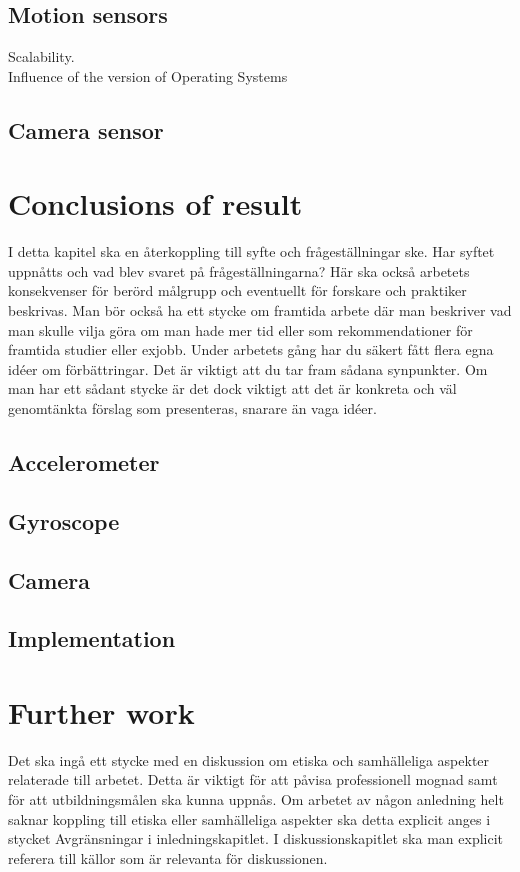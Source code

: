 \subsection{Motion sensors}
Scalability.\\
Influence of the version of Operating Systems \\

\subsection{Camera sensor}


\section{Conclusions of result}\label{sec:conclusion}
I detta kapitel ska en återkoppling till syfte och frågeställningar ske. Har syftet uppnåtts
och vad blev svaret på frågeställningarna? Här ska också arbetets konsekvenser för
berörd målgrupp och eventuellt för forskare och praktiker beskrivas.
Man bör också ha ett stycke om framtida arbete där man beskriver vad man skulle vilja
göra om man hade mer tid eller som rekommendationer för framtida studier eller exjobb.
Under arbetets gång har du säkert fått flera egna idéer om förbättringar. Det är viktigt att
du tar fram sådana synpunkter. Om man har ett sådant stycke är det dock viktigt att det är
konkreta och väl genomtänkta förslag som presenteras, snarare än vaga idéer.
\subsection{Accelerometer}
\subsection{Gyroscope}
\subsection{Camera}
\subsection{Implementation}

\section{Further work}
Det ska ingå ett stycke med en diskussion om etiska och samhälleliga aspekter relaterade
till arbetet. Detta är viktigt för att påvisa professionell mognad samt för att utbildningsmålen
ska kunna uppnås. Om arbetet av någon anledning helt saknar koppling till etiska eller
samhälleliga aspekter ska detta explicit anges i stycket Avgränsningar i inledningskapitlet.
I diskussionskapitlet ska man explicit referera till källor som är relevanta för diskussionen.